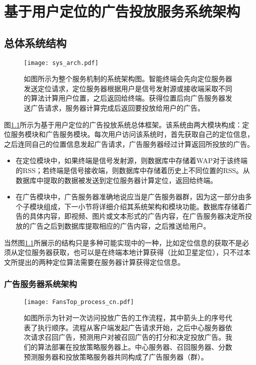 \chapter{基于用户定位的广告投放服务系统架构}
\label{cha:sys_arch}

\section{总体系统结构}

\begin{figure}[tb]
	\centering
	\texttt{[image: sys\_arch.pdf]}
	\caption{如图所示为整个服务机制的系统架构图。智能终端会先向定位服务器发送定位请求，定位服务器根据用户是信号发射源或接收端采取不同的算法计算用户位置，之后返回给终端。获得位置后向广告服务器发送广告请求，服务器计算完成后返回要投放给用户的广告。}
	\label{fig:sysarch}
\end{figure}

图\ref{fig:sysarch}所示为基于用户定位的广告投放系统总体框架。该系统由两大模块构成：定位服务模块和广告服务模块。每次用户访问该系统时，首先获取自己的定位信息，之后连同自己的位置信息发起广告请求，广告服务器经过计算返回所投放的广告。
\begin{itemize}
	\item 在定位模块中，如果终端是信号发射源，则数据库中存储着WAP对于该终端的RSS；若终端是信号接收端，则数据库中存储着历史上不同位置的RSS。从数据库中提取的数据被发送到定位服务器计算定位，返回给终端。
	\item 在广告模块中，广告服务器准确地说应当是广告服务器群，因为这一部分由多个子模块组成，下一小节将详细介绍其系统架构和模块功能。数据库存储着广告的具体内容，即视频、图片或文本形式的广告内容，在广告服务器决定所投放的广告之后到数据库提取相应的广告内容，之后推送给用户。
\end{itemize}

当然图\ref{fig:sysarch}所展示的结构只是多种可能实现中的一种，比如定位信息的获取不是必须从定位服务器获取，也可以是在终端本地计算获得（比如卫星定位），只不过本文所提出的两种定位算法需要在服务器计算获得定位信息。

\subsection{广告服务器系统架构}

\begin{figure}[tb]
	\centering
	\texttt{[image: FansTop\_process\_cn.pdf]}
	\caption{如图所示为针对一次访问投放广告的工作流程，其中箭头上的序号代表了执行顺序。流程从客户端发起广告请求开始，之后中心服务器依次请求召回广告，预测用户对被召回广告的打分和决定投放广告。我们的算法部署在投放策略服务器上。中心服务器、召回服务器、分数预测服务器和投放策略服务器共同构成了广告服务器（群）。}
	\label{fig:fssys}
\end{figure}

